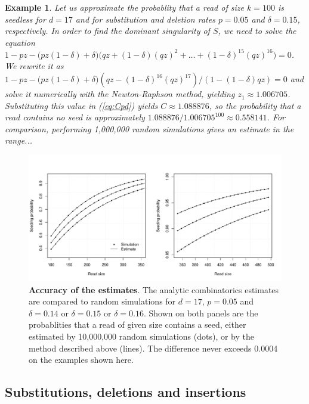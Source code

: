\documentclass{article}
\newtheorem{example}{Example}
\begin{document}
\begin{example}
Let us approximate the probablity that a read of size $k = 100$ is
seedless for $d=17$ and for substitution and deletion rates $p = 0.05$ and
$\delta = 0.15$, respectively. In order to find the dominant singularity of
$S$, we need to solve the equation $1-pz - \big(pz(1-\delta) +
\delta\big)\big(qz+(1-\delta)(qz)^2 + \ldots +
(1-\delta)^{15}(qz)^{16}\big) = 0$. We rewrite it as $1-pz -
\big(pz(1-\delta)+\delta\big)(qz-(1-\delta)^{16}(qz)^{17}) /
(1-(1-\delta)qz) = 0$ and solve it numerically with the Newton-Raphson
method, yielding $z_1 \approx 1.006705$. Substituting this value in
(\ref{eq:Cpd}) yields $C \approx 1.088876$, so the probability that a read
contains no seed is approximately $1.088876 / 1.006705^{100} \approx
0.558141$. For comparison, performing 1,000,000 random simulations gives
an estimate in the range...
\end{example}

\begin{figure}[h]
\centering
\includegraphics[scale=0.445]{simulpdel.pdf}
\caption{\textbf{Accuracy of the estimates}. The analytic combinatorics
estimates are compared to random simulations for $d=17$, $p=0.05$ and
$\delta=0.14$ or $\delta=0.15$ or $\delta=0.16$. Shown on both panels are
the probablities that a read of given size contains a seed, either
estimated by 10,000,000 random simulations (dots), or by the method
described above (lines). The difference never exceeds 0.0004 on the
examples shown here.}
\label{fig:simulpdel}
\end{figure}





\subsection{Substitutions, deletions and insertions}
\label{subsec:sdi}
\end{document}
